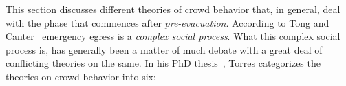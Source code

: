 
This section discusses different theories of crowd behavior that, in general, deal with the phase that commences after \emph{pre-evacuation}. According to Tong and Canter~\cite{Tong:1985wn} emergency egress is a \emph{complex social process}. What this complex social process is, has generally been a matter of much debate with a great deal of conflicting theories on the same. In his PhD thesis~\cite{Torres:2010tj}, Torres categorizes the theories on crowd behavior into six:

